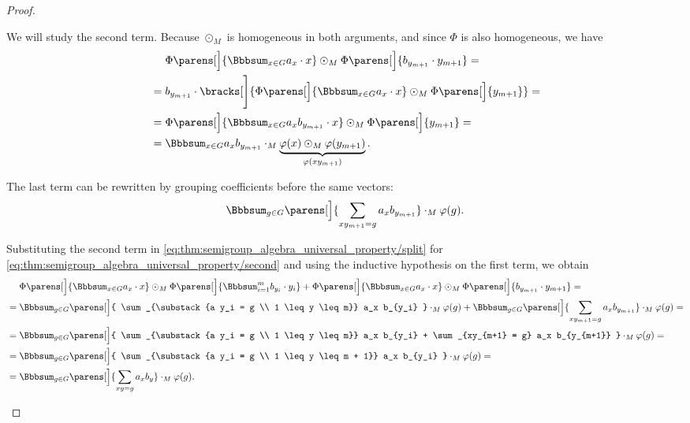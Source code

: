 \begin{proof}
\begin{itemize}
    We will study the second term. Because \( \odot_M \) is homogeneous in both arguments, and since \( \Phi \) is also homogeneous, we have
    \begin{align*}
      &\phantom{{}={}}
      \Phi\parens[\Big]{ \Bbbsum_{x \in G} a_x \cdot x } \odot_M \Phi\parens[\Big]{ b_{y_{m+1}} \cdot y_{m+1} }
      = \\ &=
      b_{y_{m+1}} \cdot \bracks[\Bigg]{ \Phi\parens[\Big]{ \Bbbsum_{x \in G} a_x \cdot x } \odot_M \Phi\parens[\Big]{ y_{m+1} } }
      = \\ &=
      \Phi\parens[\Big]{ \Bbbsum_{x \in G} a_x b_{y_{m+1}} \cdot x } \odot_M \Phi\parens[\Big]{ y_{m+1} }
      = \\ &=
      \Bbbsum_{x \in G} a_x b_{y_{m+1}} \cdot_M \underbrace{\varphi(x) \odot_M \varphi(y_{m+1})}_{\varphi(xy_{m+1})}.
    \end{align*}

    The last term can be rewritten by grouping coefficients before the same vectors:
    \begin{equation}\label{eq:thm:semigroup_algebra_universal_property/second}
      \Bbbsum_{g \in G} \parens[\Big]{ \sum_{xy_{m+1} = g} a_x b_{y_{m+1}} } \cdot_M \varphi(g).
    \end{equation}

    Substituting the second term in \eqref{eq:thm:semigroup_algebra_universal_property/split} for \eqref{eq:thm:semigroup_algebra_universal_property/second} and using the inductive hypothesis on the first term, we obtain
    \begin{align*}
      &\phantom{{}={}}
      \Phi\parens[\Big]{ \Bbbsum_{x \in G} a_x \cdot x } \odot_M \Phi\parens[\Big]{ \Bbbsum_{i=1}^m b_{y_i} \cdot y_i } + \Phi\parens[\Big]{ \Bbbsum_{x \in G} a_x \cdot x } \odot_M \Phi\parens[\Big]{ b_{y_{m+1}} \cdot y_{m+1} }
      = \\ &=
      \Bbbsum_{g \in G} \parens[\Big]{ \sum_{\substack{a y_i = g \\ 1 \leq y \leq m}} a_x b_{y_i} } \cdot_M \varphi(g) + \Bbbsum_{g \in G} \parens[\Big]{ \sum_{xy_{m+1} = g} a_x b_{y_{m+1}} } \cdot_M \varphi(g)
      = \\ &=
      \Bbbsum_{g \in G} \parens[\Big]{ \sum_{\substack{a y_i = g \\ 1 \leq y \leq m}} a_x b_{y_i} + \sum_{xy_{m+1} = g} a_x b_{y_{m+1}} } \cdot_M \varphi(g)
      = \\ &=
      \Bbbsum_{g \in G} \parens[\Big]{ \sum_{\substack{a y_i = g \\ 1 \leq y \leq m + 1}} a_x b_{y_i} } \cdot_M \varphi(g)
      = \\ &=
      \Bbbsum_{g \in G} \parens[\Big]{ \sum_{x y = g} a_x b_y } \cdot_M \varphi(g).
    \end{align*}
  \end{itemize}


\end{proof}
